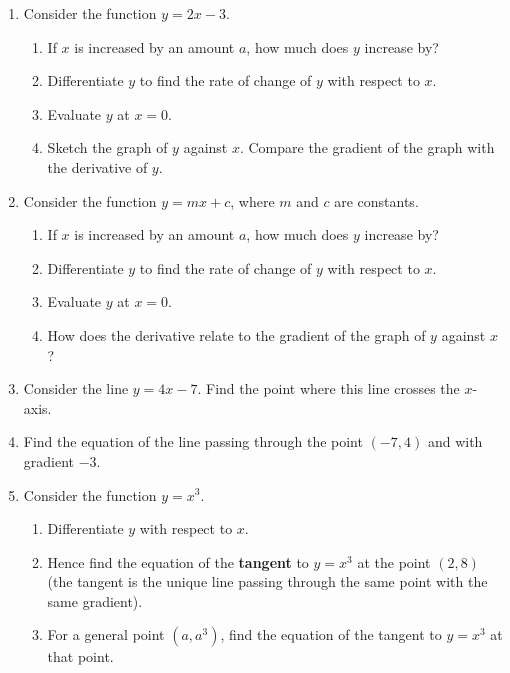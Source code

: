 \documentclass{article}
\begin{document}
\begin{enumerate}
	\item Consider the function $y=2x-3$.
		\begin{enumerate}
			\item If $x$ is increased by an amount $a$, how much does $y$ increase by?
			\item Differentiate $y$ to find the rate of change of $y$ with respect to $x$.
			\item Evaluate $y$ at $x=0$.
			\item Sketch the graph of $y$ against $x$. Compare the gradient of the graph with the derivative of $y$.
		\end{enumerate}
	\item Consider the function $y=mx+c$, where $m$ and $c$ are constants.
		\begin{enumerate}
			\item If $x$ is increased by an amount $a$, how much does $y$ increase by?
			\item Differentiate $y$ to find the rate of change of $y$ with respect to $x$.
			\item Evaluate $y$ at $x=0$.
			\item How does the derivative relate to the gradient of the graph of $y$ against $x$?
		\end{enumerate}
	\item Consider the line $y=4x-7$. Find the point where this line crosses the $x$-axis.
	\item Find the equation of the line passing through the point $(-7,4)$ and with gradient $-3$.
	\item Consider the function $y=x^3$.
		\begin{enumerate}
			\item Differentiate $y$ with respect to $x$.
			\item Hence find the equation of the \textbf{tangent} to $y=x^3$ at the point $(2,8)$ (the tangent is the unique line passing through the same point with the same gradient).
			\item For a general point $(a,a^3)$, find the equation of the tangent to $y=x^3$ at that point.
		\end{enumerate}
\end{enumerate}







\clearpage
\end{document}

